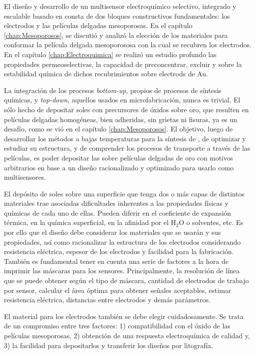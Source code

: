 	El diseño y desarrollo de un multisensor electroquímico selectivo, integrado y escalable basado en \pdm\space consta de dos bloques constructivos fundamentales: los electrodos y las películas delgadas mesoporosas. En el capítulo \ref{chap:Mesoporosos}, se discutió y analizó la elección de los materiales para conformar la película delgada mesoporososa con la cual se recubren los electrodos. En el capítulo \ref{chap:Electroquimica} se realizó un estudio profundo las propiedades permeoselectivas, la capacidad de preconcentrar, excluir y sobre la estabilidad química de dichos recubrimientos sobre electrods de Au.

	La integración de los procesos \textit{bottom-up}, propios de procesos de síntesis químicas, y \textit{top-down}, aquellos usados en microfabricación, nunca es trivial. El sólo hecho de depositar soles con precursores de óxidos sobre oro, que resulten en películas delgadas homogéneas, bien adheridas, sin grietas ni fisuras, ya es un desafío, como se vió en el capítulo \ref{chap:Mesoporosos}. El objetivo, luego de desarrollar los métodos a bajas temperaturas para la síntesis de \pdm, de optimizar y estudiar su estructura, y de comprender los procesos de transporte a través de las películas, es poder depositar las \pdm\space sobre películas delgadas de oro con motivos arbitrarios en base a un diseño racionalizado y optimizado para usarlo como multisensores. 

	El depósito de soles sobre una superficie que tenga dos o más capas de distintos  materiales trae asociadas dificultades inherentes a las propiedades físicas y químicas de cada uno de ellas. Pueden diferir en el coeficiente de expansión térmica, en la química superficial, en la afinidad por el H$_2$O o solventes, etc.
	Es por ello que el diseño debe considerar los materiales que se usarán y sus propiedades, así como racionalizar la estructura de los electrodos considerando resistencia eléctrica, espesor de los electrodos y facilidad para la fabricación. También es fundamental tener en cuenta una serie de factores a la hora de imprimir las máscaras para los sensores. Principalmente, la resolución de línea que se puede obtener según el tipo de máscara, cantidad de electrodos de trabajo por sensor, calcular el área óptima para obtener señales aceptables, estimar resistencia eléctrica, distancias entre electrodos y demás parámetros.

	El material para los electrodos también se debe elegir cuidadosamente. Se trata de un compromiso entre tres factores: 1) compatibilidad con el óxido de las películas mesoporosas, 2) obtención de una respuesta electroquímica de calidad y, 3) la facilidad para depositarlos y transferir los diseños por litografía.

